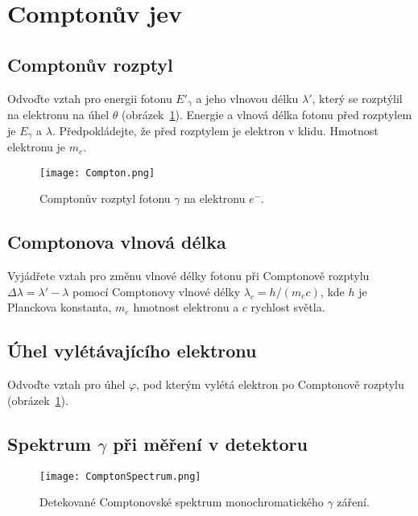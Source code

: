 \section{Comptonův jev}
    \subsection{Comptonův rozptyl}
        Odvoďte vztah pro energii fotonu $E'_{\gamma}$ a jeho vlnovou délku $\lambda'$, který se rozptýlil na elektronu na úhel $\theta$ (obrázek~\ref{fig:Compton}).
        Energie a vlnová délka fotonu před rozptylem je $E_{\gamma}$ a $\lambda$.
        Předpokládejte, že před rozptylem je elektron v klidu.
        Hmotnost elektronu je $m_{e}$.

        \begin{figure}[!h]
            \centering
            \texttt{[image: Compton.png]}
            \caption{Comptonův rozptyl fotonu $\gamma$ na elektronu $e^{-}$.}
            \label{fig:Compton}
        \end{figure}

    \subsection{Comptonova vlnová délka}
        Vyjádřete vztah pro změnu vlnové délky fotonu při Comptonově rozptylu $\Delta\lambda=\lambda'-\lambda$ pomocí Comptonovy vlnové délky $\lambda_{c}=h/(m_{e}c)$, kde $h$ je Planckova konstanta, $m_{e}$ hmotnost elektronu a $c$ rychlost světla.

    \subsection{Úhel vylétávajícího elektronu}
        Odvoďte vztah pro úhel $\varphi$, pod kterým vylétá elektron po Comptonově rozptylu (obrázek~\ref{fig:Compton}).

    \subsection{Spektrum $\gamma$ při měření v detektoru}
        \begin{figure}[!h]
            \centering
            \texttt{[image: ComptonSpectrum.png]}
            \caption{Detekované Comptonovské spektrum monochromatického $\gamma$ záření.}
            \label{fig:ComptonSpectrum}
        \end{figure}        
    
